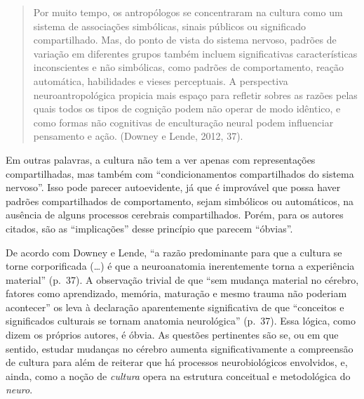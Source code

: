 \begin{quote}
Por muito tempo, os antropólogos se concentraram na cultura como um
sistema de associações simbólicas, sinais públicos ou significado
compartilhado. Mas, do ponto de vista do sistema nervoso, padrões de
variação em diferentes grupos também incluem significativas
características inconscientes e não simbólicas, como padrões de
comportamento, reação automática, habilidades e vieses perceptuais. A
perspectiva neuroantropológica propicia mais espaço para refletir sobres as
razões pelas quais todos os tipos de cognição podem não operar de modo
idêntico, e como formas não cognitivas de enculturação neural podem
influenciar pensamento e ação. (Downey e Lende, 2012, 37).
\end{quote}

Em outras palavras, a cultura não tem a ver apenas com representações
compartilhadas, mas também com ``condicionamentos compartilhados do
sistema nervoso''. Isso pode parecer autoevidente, já que é improvável
que possa haver padrões compartilhados de comportamento, sejam
simbólicos ou automáticos, na ausência de alguns processos cerebrais
compartilhados. Porém, para os autores citados, são as ``implicações''
desse princípio que parecem ``óbvias''.

De acordo com Downey e Lende, ``a razão predominante para que a
cultura se torne corporificada (\ldots{}) é que a neuroanatomia inerentemente
torna a experiência material'' (p.~37). A observação trivial de que ``sem
mudança material no cérebro, fatores como aprendizado, memória,
maturação e mesmo trauma não poderiam acontecer'' os leva à declaração
aparentemente significativa de que ``conceitos e significados culturais
se tornam anatomia neurológica'' (p.~37). Essa lógica, como dizem os
próprios autores, é óbvia. As questões pertinentes são se, ou em que
sentido, estudar mudanças no cérebro aumenta significativamente a
compreensão de cultura para além de reiterar que há processos
neurobiológicos envolvidos, e, ainda, como a noção de \emph{cultura}
opera na estrutura conceitual e metodológica do \emph{neuro}.

